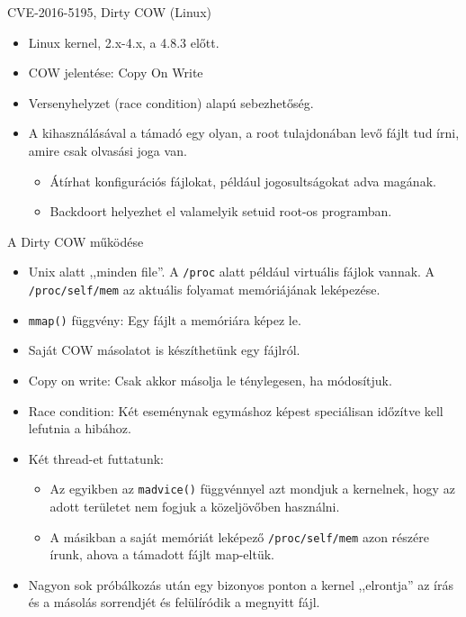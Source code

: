 \documentclass[12 pt]{beamer}
\begin{document}
\begin{frame}{CVE-2016-5195, Dirty COW (Linux)}
  \begin{itemize}
    \item{Linux kernel, 2.x-4.x, a 4.8.3 előtt.}
    \item{COW jelentése: Copy On Write}
    \item{Versenyhelyzet (race condition) alapú sebezhetőség.}
    \item{A kihasználásával a támadó egy olyan, a root tulajdonában levő fájlt tud írni, amire csak olvasási joga van.}
      \begin{itemize}
        \item{Átírhat konfigurációs fájlokat, például jogosultságokat adva magának.}
        \item{Backdoort helyezhet el valamelyik setuid root-os programban.}
      \end{itemize}
  \end{itemize}
\end{frame}

\begin{frame}{A Dirty COW működése}
  \begin{itemize}
    \item{Unix alatt ,,minden file''. A \texttt{/proc} alatt például virtuális fájlok vannak. A \texttt{/proc/self/mem} az aktuális folyamat memóriájának leképezése.}
    \item{\texttt{mmap()} függvény: Egy fájlt a memóriára képez le.}
    \item{Saját COW másolatot is készíthetünk egy fájlról.}
    \item{Copy on write: Csak akkor másolja le ténylegesen, ha módosítjuk.}
    \item{Race condition: Két eseménynak egymáshoz képest speciálisan időzítve kell lefutnia a hibához.}
    \item{Két thread-et futtatunk:}
      \begin{itemize}
        \item{Az egyikben az \texttt{madvice()} függvénnyel azt mondjuk a kernelnek, hogy az adott területet nem fogjuk a közeljövőben használni.}
        \item{A másikban a saját memóriát leképező \texttt{/proc/self/mem} azon részére írunk, ahova a támadott fájlt map-eltük.}
      \end{itemize}
    \item{Nagyon sok próbálkozás után egy bizonyos ponton a kernel ,,elrontja'' az írás és a másolás sorrendjét és felülíródik a megnyitt fájl.}
  \end{itemize}
\end{frame}
\end{document}
